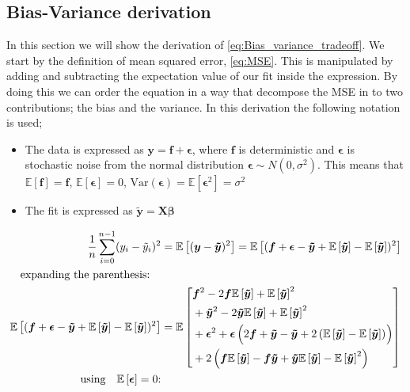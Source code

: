 \documentclass[10pt, twocolumn]{article}
\providecommand{\forv}[1]
{
\ensuremath{\mathbb{E}\left[#1\right]}
}
\providecommand{\forvsum}[1]
{
\ensuremath{\frac{1}{n}\sum_{i=0}^{n-1} #1}
}
\providecommand{\bmt}[1]
{
\ensuremath{\bm{\tilde{#1}}}
}
\begin{document}
\onecolumn

\newpage
\begin{appendices}
\section{Bias-Variance derivation}
\label{asec:Bias-Variance-derivation}
In this section we will show the derivation of \cref{eq:Bias_variance_tradeoff}. We start by the definition of mean squared error, \cref{eq:MSE}. This is manipulated by adding and subtracting the expectation value of our fit inside the expression. By doing this we can order the equation in a way that decompose the MSE in to two contributions; the bias and the variance. In this derivation the following notation is used;
\begin{itemize}
    \item The data is expressed as $\bm{y} = \bm{f} + \bm{\epsilon}$, where $\bm{f}$ is deterministic and $\bm{\epsilon}$ is stochastic noise from the normal distribution $\bm{\epsilon} \sim N(0,\sigma^2)$. This means that $\forv{\bm{f}} = \bm{f}$, $\forv{\bm{\epsilon}} = 0$, $\mathrm{Var}(\bm{\epsilon}) = \forv{\bm{\epsilon}^2} = \sigma^2$
    \item The fit is expressed as $\bm{\tilde{y}} = \bm{X}\bm{\beta}$
\end{itemize}
\begin{align*}
    \forvsum{(y_i - \tilde{y}_i)^2} &= \forv{(\bm{y} - \bmt{y})^2} = \forv{(\bm{f} + \bm{\epsilon} - \bmt{y} + \forv{\bmt{y}} - \forv{\bmt{y}})^2}
    \\
    \qq*{expanding the parenthesis:}
    \\
    \forv{
        (\bm{f} + \bm{\epsilon} - \bmt{y} + \forv{\bmt{y}} - \forv{\bmt{y}})^2} &=
        \forv{
        \begin{aligned}
        &\bm{f}^2 - 2 \bm{f}\forv{\bmt{y}}+\forv{\bmt{y}}^2
        \\
        &+ \bmt{y}^2 - 2 \bmt{y}\forv{\bmt{y}} + \forv{\bmt{y}}^2
        \\
        & + \bm{\epsilon}^2 + \bm{\epsilon} \left(2\bm{f} + \bmt{y} - \bmt{y} + 2\left(\forv{\bmt{y}} -\forv{\bmt{y}}\right)^{\vphantom{2}} \right)
        \\
        & + 2\left(\bm{f}\forv{\bmt{y}}- \bm{f}\bmt{y} + \bmt{y}\forv{\bmt{y}} - \forv{\bmt{y}}^2\right)
        \end{aligned}
    }
    \\
    \qq*{using} \forv{\bm{\epsilon}} = 0\text{:}

\end{align*}
\end{appendices}
\end{document}
